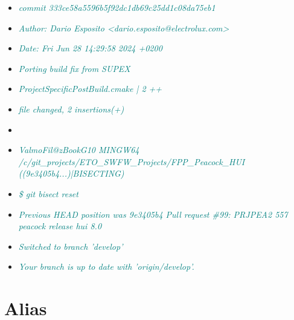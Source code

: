 \documentclass[a4paper,portrait,10pt]{article}   %
\newcommand{\mysecvspace}{\vspace{6mm}}   %
\newcommand{\mytextfilecolor}{teal}   %
\newcommand{\myexfont}{\small}   %
\begin{document}
\begin{itemize}
\begin{itemize}
  \item[] \textcolor{\mytextfilecolor}{\textit{\myexfont commit 333ce58a5596b5f92dc1db69c25dd1c08da75eb1}}
  \item[] \textcolor{\mytextfilecolor}{\textit{\myexfont Author: Dario Esposito <dario.esposito@electrolux.com>}}
  \item[] \textcolor{\mytextfilecolor}{\textit{\myexfont Date:   Fri Jun 28 14:29:58 2024 +0200}}
  \item[] \textcolor{\mytextfilecolor}{\textit{\myexfont \;\;\;\; Porting build fix from SUPEX}}
  \item[] \textcolor{\mytextfilecolor}{\textit{\myexfont \;\;\;\; ProjectSpecificPostBuild.cmake | 2 ++}}
  \item[] \textcolor{\mytextfilecolor}{\textit{\myexfont \;\;\; file changed, 2 insertions(+)}}
  \item[]
  \item[] \textcolor{\mytextfilecolor}{\textit{\myexfont ValmoFil@zBookG10 MINGW64 /c/git\_projects/ETO\_SWFW\_Projects/FPP\_Peacock\_HUI ((9e3405b4...)|BISECTING)}}
  \item[] \textcolor{\mytextfilecolor}{\textit{\myexfont \$ git bisect reset}}
  \item[] \textcolor{\mytextfilecolor}{\textit{\myexfont Previous HEAD position was 9e3405b4 Pull request \#99: PRJPEA2 557 peacock release hui 8.0}}
  \item[] \textcolor{\mytextfilecolor}{\textit{\myexfont Switched to branch 'develop'}}
  \item[] \textcolor{\mytextfilecolor}{\textit{\myexfont Your branch is up to date with 'origin/develop'.}}
\end{itemize}
\end{itemize}
\mysecvspace


\section{Alias}   \label{sec:Alias}
\end{document}
